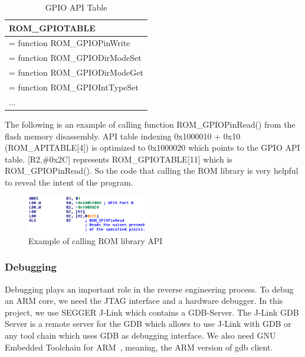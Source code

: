 \begin{center}
	\begin{table}
		\begin{tabular}{|p{7.2cm}|} 
			\hline
			ROM\_GPIOTABLE \\ [0.5ex] 
			\hline
			[0] = function ROM\_GPIOPinWrite \\
			\hline
			[1] = function ROM\_GPIODirModeSet \\
			\hline
			[2] = function ROM\_GPIODirModeGet \\
			\hline
			[3] = function ROM\_GPIOIntTypeSet \\
			\hline
			... \\ 
			\hline
		\end{tabular}
		\caption{GPIO API Table}
		\label{tab:gpiotable}
	\end{table}
\end{center}


The following is an example of calling function ROM\_GPIOPinRead() from the flash memory disassembly. API table indexing 0x1000010 + 0x10 (ROM\_APITABLE[4]) is optimized to 0x1000020 which points to the GPIO API table. [R2,\#0x2C] represents ROM\_GPIOTABLE[11] which is ROM\_GPIOPinRead(). So the code that calling the ROM library is very helpful to reveal the intent of the program.


\begin{figure}[th]
	\includegraphics[width=0.47\textwidth]{figures/romapiexample}
	\centering
	\caption{Example of calling ROM library API}
	\label{fig:romapiexample}
\end{figure}



\subsubsection{Debugging}

Debugging plays an important role in the reverse engineering process. To debug an ARM core, we need the JTAG interface and a hardware debugger. In this project, we use SEGGER J-Link which contains a GDB-Server. The J-Link GDB Server is a remote server for the GDB which allows to use J-Link with GDB or any tool chain which uses GDB as debugging interface. We also need GNU Embedded Toolchain for ARM~\cite{gnutoolchainarm}, meaning, the ARM version of gdb client.

